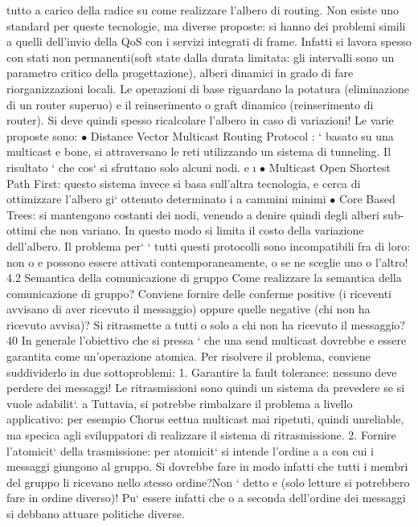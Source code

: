 \documentclass[a4paper,12pt]{article}
\begin{document}
tutto a carico della radice su come realizzare l'albero di routing.
Non esiste uno standard per queste tecnologie, ma diverse proposte: si hanno
dei problemi simili a quelli dell'invio della QoS con i servizi integrati di frame.
Infatti si lavora spesso con stati non permanenti(soft state dalla durata limitata:
gli intervalli sono un parametro critico della progettazione), alberi dinamici
in grado di fare riorganizzazioni locali. Le operazioni di base riguardano la
potatura (eliminazione di un router superuo) e il reinserimento o graft dinamico
(reinserimento di router). Si deve quindi spesso ricalcolare l'albero in caso di
variazioni! Le varie proposte sono:
$\bullet$ Distance Vector Multicast Routing Protocol : ` basato su una multicast
e
bone, si attraversano le reti utilizzando un sistema di tunneling. Il risultato
` che cos` si sfruttano solo alcuni nodi.
e
\i{}
$\bullet$ Multicast Open Shortest Path First: questo sistema invece si basa sull'altra tecnologia, e cerca di
ottimizzare l'albero gi` ottenuto determinato i
a
cammini minimi
$\bullet$ Core Based Trees: si mantengono costanti dei nodi, venendo a denire
quindi degli alberi sub-ottimi che non variano. In questo modo si limita il
costo della variazione dell'albero.
Il problema per` ` tutti questi protocolli sono incompatibili fra di loro: non
o e
possono essere attivati contemporaneamente, o se ne sceglie uno o l'altro!
4.2
Semantica della comunicazione di gruppo
Come realizzare la semantica della comunicazione di gruppo? Conviene fornire
delle conferme positive (i riceventi avvisano di aver ricevuto il messaggio) oppure
quelle negative (chi non ha ricevuto avvisa)? Si ritrasmette a tutti o solo a chi
non ha ricevuto il messaggio?
40
In generale l'obiettivo che si pressa ` che una send multicast dovrebbe
e
essere garantita come un'operazione atomica. Per risolvere il problema, conviene
suddividerlo in due sottoproblemi:
1. Garantire la fault tolerance: nessuno deve perdere dei messaggi! Le ritrasmissioni sono quindi un sistema da
prevedere se si vuole adabilit`.
a
Tuttavia, si potrebbe rimbalzare il problema a livello applicativo: per
esempio Chorus eettua multicast mai ripetuti, quindi unreliable, ma
specica agli sviluppatori di realizzare il sistema di ritrasmissione.
2. Fornire l'atomicit` della trasmissione: per atomicit` si intende l'ordine
a
a
con cui i messaggi giungono al gruppo. Si dovrebbe fare in modo infatti
che tutti i membri del gruppo li ricevano nello stesso ordine?Non ` detto
e
(solo letture si potrebbero fare in ordine diverso)! Pu` essere infatti che
o
a seconda dell'ordine dei messaggi si debbano attuare politiche diverse.
\end{document}
